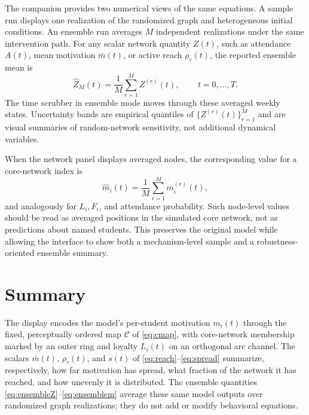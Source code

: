 \documentclass[11pt]{article}
\begin{document}
The companion provides two numerical views of the same equations. A sample run displays one
realization of the randomized graph and heterogeneous initial conditions. An ensemble run averages
$M$ independent realizations under the same intervention path. For any scalar network quantity
$Z(t)$, such as attendance $A(t)$, mean motivation $\bar m(t)$, or active reach $\rho_\tau(t)$, the
reported ensemble mean is
\begin{equation}
  \widehat Z_M(t)=\frac{1}{M}\sum_{r=1}^{M} Z^{(r)}(t),
  \,\qquad t=0,\dots,T.
  \label{eq:ensembleZ}
\end{equation}
The time scrubber in ensemble mode moves through these averaged weekly states. Uncertainty bands are
empirical quantiles of $\{Z^{(r)}(t)\}_{r=1}^{M}$ and are visual summaries of random-network
sensitivity, not additional dynamical variables.

When the network panel displays averaged nodes, the corresponding value for a core-network index is
\begin{equation}
  \widehat m_i(t)=\frac{1}{M}\sum_{r=1}^{M} m_i^{(r)}(t),
  \label{eq:ensemblem}
\end{equation}
and analogously for $L_i,F_i$, and attendance probability. Such node-level values should be read as
averaged positions in the simulated core network, not as predictions about named students. This
preserves the original model while allowing the interface to show both a mechanism-level sample and a
robustness-oriented ensemble summary.

\section{Summary}

The display encodes the model's per-student motivation $m_i(t)$ through the fixed, perceptually
ordered map $\mathcal{C}$ of \eqref{eq:cmap}, with core-network membership marked by an outer ring
and loyalty $L_i(t)$ on an orthogonal arc channel. The scalars $\bar m(t)$, $\rho_\tau(t)$, and
$s(t)$ of \eqref{eq:reach}--\eqref{eq:spread} summarize, respectively, how far motivation has
spread, what fraction of the network it has reached, and how unevenly it is distributed. The
ensemble quantities \eqref{eq:ensembleZ}--\eqref{eq:ensemblem} average these same model outputs over
randomized graph realizations; they do not add or modify behavioral equations.
\end{document}
